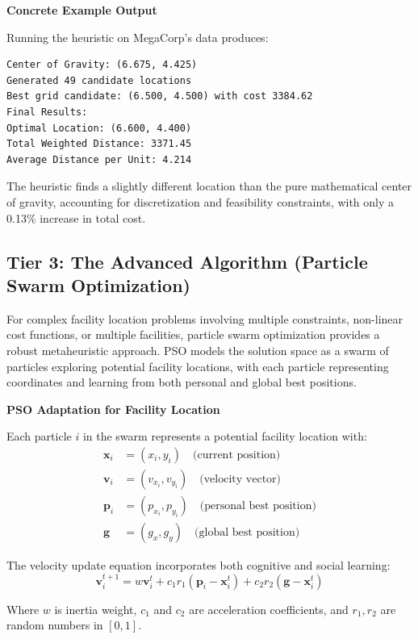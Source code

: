 \documentclass{article}
\begin{document}
\textbf{Concrete Example Output}

Running the heuristic on MegaCorp's data produces:

\begin{verbatim}
Center of Gravity: (6.675, 4.425)
Generated 49 candidate locations
Best grid candidate: (6.500, 4.500) with cost 3384.62
Final Results:
Optimal Location: (6.600, 4.400)
Total Weighted Distance: 3371.45
Average Distance per Unit: 4.214
\end{verbatim}

The heuristic finds a slightly different location than the pure mathematical center of gravity, accounting for discretization and feasibility constraints, with only a 0.13\% increase in total cost.

\subsection{Tier 3: The Advanced Algorithm (Particle Swarm Optimization)}

For complex facility location problems involving multiple constraints, non-linear cost functions, or multiple facilities, particle swarm optimization provides a robust metaheuristic approach. PSO models the solution space as a swarm of particles exploring potential facility locations, with each particle representing coordinates and learning from both personal and global best positions.

\textbf{PSO Adaptation for Facility Location}

Each particle $i$ in the swarm represents a potential facility location with:
\begin{align}
\mathbf{x}_i &= (x_i, y_i) \quad \text{(current position)} \\
\mathbf{v}_i &= (v_{x_i}, v_{y_i}) \quad \text{(velocity vector)} \\
\mathbf{p}_i &= (p_{x_i}, p_{y_i}) \quad \text{(personal best position)} \\
\mathbf{g} &= (g_x, g_y) \quad \text{(global best position)}
\end{align}

The velocity update equation incorporates both cognitive and social learning:
\[
\mathbf{v}_i^{t+1} = w \mathbf{v}_i^t + c_1 r_1 (\mathbf{p}_i - \mathbf{x}_i^t) + c_2 r_2 (\mathbf{g} - \mathbf{x}_i^t)
\]

Where $w$ is inertia weight, $c_1$ and $c_2$ are acceleration coefficients, and $r_1, r_2$ are random numbers in $[0,1]$.
\end{document}
